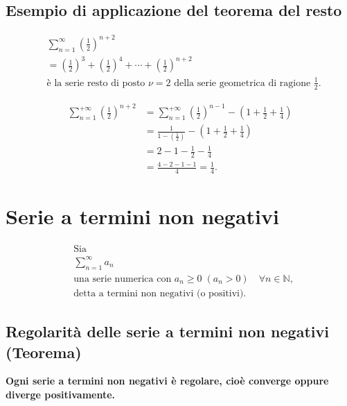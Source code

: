 \documentclass{article}
\begin{document}
\subsection*{Esempio di applicazione del teorema del resto}

\begin{align*}
    &\sum_{n=1}^{\infty} \left( \frac{1}{2} \right)^{n+2} \\
    &= \left( \frac{1}{2} \right)^3 + \left( \frac{1}{2} \right)^4 + \cdots + \left( \frac{1}{2} \right)^{n+2} \\
    &\text{è la serie resto di posto } \nu = 2 \text{ della serie geometrica di ragione } \frac{1}{2}.
\end{align*}

\begin{align*}
    \sum_{n=1}^{+\infty} \left( \frac{1}{2} \right)^{n+2} &= \sum_{n=1}^{+\infty} \left( \frac{1}{2} \right)^{n-1} - \left( 1 + \frac{1}{2} + \frac{1}{4} \right) \\
    &= \frac{1}{1 - \left( \frac{1}{2} \right)} - \left( 1 + \frac{1}{2} + \frac{1}{4} \right) \\
    &= 2 - 1 - \frac{1}{2} - \frac{1}{4} \\
    &= \frac{4 - 2 - 1 - 1}{4} = \frac{1}{4}.
\end{align*}

\section*{Serie a termini non negativi}
\begin{align*}
    &\text{Sia} \\
    &\sum_{n=1}^{\infty} a_n \\
    &\text{una serie numerica con $a_n \geq 0 \; (a_n > 0)$} \quad \forall n \in \mathbb{N}, \\
    &\text{detta a termini non negativi (o positivi).}
\end{align*}

\subsection*{Regolarità delle serie a termini non negativi (Teorema)}
\textbf{Ogni serie a termini non negativi è regolare, cioè converge oppure diverge positivamente.}
\end{document}
